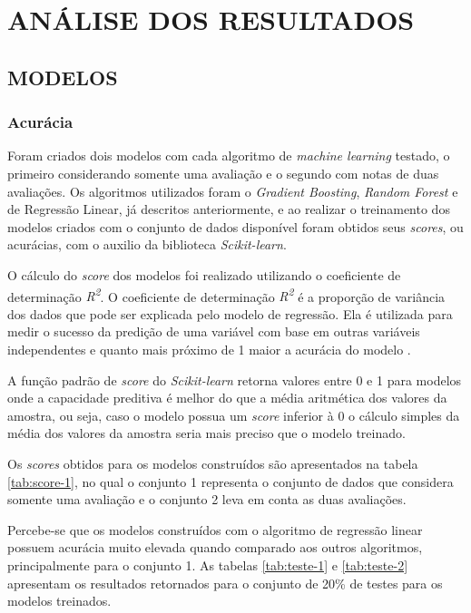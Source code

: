 \chapter{ANÁLISE DOS RESULTADOS}

\section{MODELOS}

\subsection{Acurácia}

Foram criados dois modelos com cada algoritmo de \textit{machine learning} testado, o primeiro considerando somente uma avaliação e o segundo com notas de duas avaliações.
Os algoritmos utilizados foram o \textit{Gradient Boosting}, \textit{Random Forest} e de Regressão Linear, já descritos anteriormente, e ao realizar o treinamento dos modelos criados com o conjunto de dados disponível foram obtidos seus \textit{scores}, ou acurácias, com o auxilio da biblioteca \textit{Scikit-learn}.

O cálculo do \textit{score} dos modelos foi realizado utilizando o coeficiente de determinação \textit{R\textsuperscript{2}}.
O coeficiente de determinação \textit{R\textsuperscript{2}} é a proporção de variância dos dados que pode ser explicada pelo modelo de regressão. Ela é utilizada para medir o sucesso da predição de uma variável com base em outras variáveis independentes e quanto mais próximo de 1 maior a acurácia do modelo \cite{NAGEKERKE1991}.

A função padrão de \textit{score} do \textit{Scikit-learn} retorna valores entre 0 e 1 para modelos onde a capacidade preditiva é melhor do que a média aritmética dos valores da amostra, ou seja, caso o modelo possua um \textit{score} inferior à 0 o cálculo simples da média dos valores da amostra seria mais preciso que o modelo treinado.

Os \textit{scores} obtidos para os modelos construídos são apresentados na tabela \ref{tab:score-1}, no qual o conjunto 1 representa o conjunto de dados que considera somente uma avaliação e o conjunto 2 leva em conta as duas avaliações.



Percebe-se que os modelos construídos com o algoritmo de regressão linear possuem acurácia muito elevada quando comparado aos outros algoritmos, principalmente para o conjunto 1. 
As tabelas \ref{tab:teste-1} e \ref{tab:teste-2} apresentam os resultados retornados para o conjunto de 20\% de testes para os modelos treinados. 

